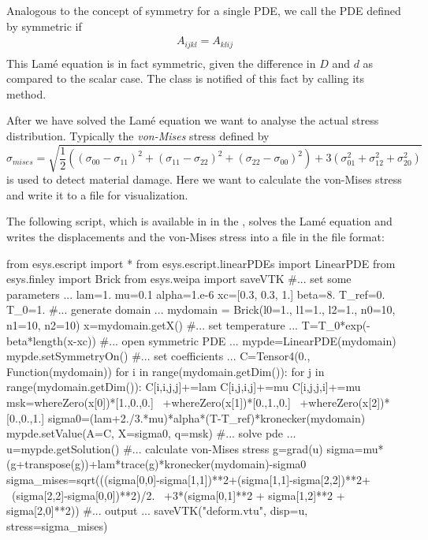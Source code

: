 Analogous to the concept of symmetry for a single PDE, we call the PDE
defined by  symmetric if
\begin{eqnarray}\label{LINEARPDE.SYSTEM.SYMMETRY TUTORIAL}
A_{ijkl} =A_{klij} \\
\end{eqnarray}
This Lam\'e equation is in fact symmetric, given the difference in $D$ and $d$ as compared to the scalar case.
The \LinearPDE class is notified of this fact by calling its  method.

After we have solved the Lam\'e equation we want to analyse the actual stress distribution.
Typically the \emph{von-Mises} stress defined by
\begin{equation}
\sigma_{mises} = \sqrt{
\frac{1}{2} ((\sigma_{00}-\sigma_{11})^2
            + (\sigma_{11}-\sigma_{22})^2
            + (\sigma_{22}-\sigma_{00})^2)
+ 3( \sigma_{01}^2+\sigma_{12}^2+\sigma_{20}^2) }
\end{equation}
is used to detect material damage.
Here we want to calculate the von-Mises stress and write it to a file for visualization.

The following script, which is available in  in the
\ExampleDirectory, solves the Lam\'e equation and writes the displacements and
the von-Mises stress into a file  in
the \VTK file format:
\begin{python}
  from esys.escript import *
  from esys.escript.linearPDEs import LinearPDE
  from esys.finley import Brick
  from esys.weipa import saveVTK
  #... set some parameters ...
  lam=1.
  mu=0.1
  alpha=1.e-6
  xc=[0.3, 0.3, 1.]
  beta=8.
  T_ref=0.
  T_0=1.
  #... generate domain ...
  mydomain = Brick(l0=1., l1=1., l2=1., n0=10, n1=10, n2=10)
  x=mydomain.getX()
  #... set temperature ...
  T=T_0*exp(-beta*length(x-xc))
  #... open symmetric PDE ...
  mypde=LinearPDE(mydomain)
  mypde.setSymmetryOn()
  #... set coefficients ...
  C=Tensor4(0., Function(mydomain))
  for i in range(mydomain.getDim()):
    for j in range(mydomain.getDim()):
       C[i,i,j,j]+=lam
       C[i,j,i,j]+=mu
       C[i,j,j,i]+=mu
  msk=whereZero(x[0])*[1.,0.,0.] \
     +whereZero(x[1])*[0.,1.,0.] \
     +whereZero(x[2])*[0.,0.,1.]
  sigma0=(lam+2./3.*mu)*alpha*(T-T_ref)*kronecker(mydomain)
  mypde.setValue(A=C, X=sigma0, q=msk)
  #... solve pde ...
  u=mypde.getSolution()
  #... calculate von-Mises stress
  g=grad(u)
  sigma=mu*(g+transpose(g))+lam*trace(g)*kronecker(mydomain)-sigma0
  sigma_mises=sqrt(((sigma[0,0]-sigma[1,1])**2+(sigma[1,1]-sigma[2,2])**2+ \
                    (sigma[2,2]-sigma[0,0])**2)/2. \
                   +3*(sigma[0,1]**2 + sigma[1,2]**2 + sigma[2,0]**2))
  #... output ...
  saveVTK("deform.vtu", disp=u, stress=sigma_mises)
\end{python}

